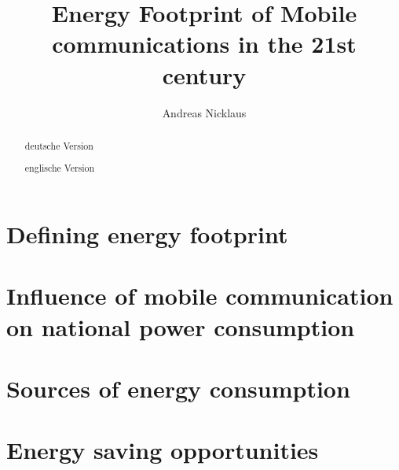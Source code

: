 \documentclass[11pt,a4paper]{article}
\title{Energy Footprint of Mobile communications in the 21st century}
\author{Andreas Nicklaus}
\begin{document}
\maketitle

\begin{abstract}
  deutsche Version
\end{abstract}


\begin{abstract}
  englische Version
\end{abstract}

\tableofcontents

\section{Defining energy footprint}
\section{Influence of mobile communication on national power consumption}
\section{Sources of energy consumption}
\section{Energy saving opportunities}

\clearpage

\appendix
\nocite{*}
\renewcommand*{\refname}{\section{References}}
{}
\end{document}
